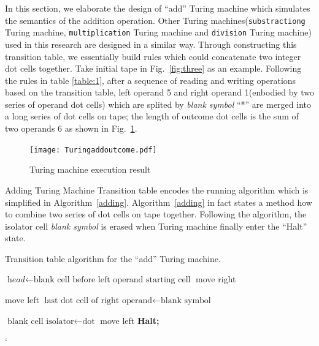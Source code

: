 \documentclass[lnicst]{svmultln}
\newcommand{\F}{Fig.}
\begin{document}
In this section, we elaborate the design of ``add'' Turing machine which
simulates the semantics of the addition operation. Other Turing
  machines(\texttt{substractiong} Turing machine, \texttt{multiplication} Turing machine and \texttt{division} Turing machine) used in this research are designed in a similar way.
  Through constructing this transition table, we essentially
  build rules which could concatenate two integer dot cells together. 
  Take initial tape in \F~\ref{fig:three} as an example. Following the rules in table \ref{table:1}, after a
  sequence of reading and writing operations based on the transition table, left operand 5 and right operand 1(enbodied by two series of
  operand dot cells) which are splited by \textit{blank symbol} ``*'' are merged into a long series of dot cells on tape; the length of
  outcome dot cells is the sum of two operands 6 as shown in \F~\ref{fig:turing_outcome}. 

\begin{figure}
 \texttt{[image: Turingaddoutcome.pdf]}
 \caption{Turing machine execution result}
 \label{fig:turing_outcome}
\end{figure}

Adding Turing Machine Transition table encodes the running algorithm which is
simplified in Algorithm~\ref{adding}. Algorithm~\ref{adding} in fact states a
method how to combine two series of dot cells on tape together. Following the
algorithm, the isolator cell \textit{blank symbol} is erased when Turing machine
finally enter the ``Halt'' state.



\begin{algorithm}
\caption{Transition table algorithm for the ``add'' Turing machine.}
\label{adding}
\begin{algorithmic}[1]
\State $\textit{head} \gets \text{blank cell before left operand starting cell}$
 move right\;
\EndWhile

\State move left
\State $\text{last dot cell of right operand} \gets \text{blank symbol}$

\EndWhile
\State $\text{blank cell isolator} \gets \text{dot}$
  move left\;
\EndWhile
\State \textbf{Halt;}
\EndProcedure
\end{algorithmic}
\end{algorithm}
`
\end{document}
